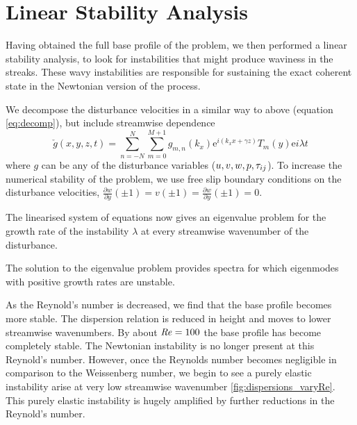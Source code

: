 \documentclass{jfm}
\newcommand{\dy}[1]{\frac{\partial #1}{\partial y}}
\newcommand{\me}{\mathrm{e}}
\newcommand\Rey{\mbox{\textit{Re}}}  %
\begin{document}
\section{Linear Stability Analysis}\label{sec:linear_stability}

Having obtained the full base profile of the problem, we then performed a linear stability analysis, to look for instabilities that might produce waviness in the streaks. These wavy instabilities are responsible for sustaining the exact coherent state in the Newtonian version of the process.

We decompose the disturbance velocities in a similar way to above (equation \ref{eq:decomp}), but include streamwise dependence
\begin{equation}
    \check{g}(x,y,z,t) = \sum_{n=-N}^{N} \sum_{m=0}^{M+1} g_{m,n}(k_{x}) \me^{i(k_{x} x + \gamma z)} T_{m}(y) \me{i\lambda t}\label{eq:decomp_disturbances}
\end{equation}
where $g$ can be any of the disturbance variables ($u,v,w,p,\boldmath{\tau}_{ij}$). To increase the numerical stability of the problem, we use free slip boundary conditions on the disturbance velocities, $\dy{w}(\pm1) = v(\pm 1) = \dy{w}(\pm1) = 0$.

The linearised system of equations now gives an eigenvalue problem for the growth rate of the instability $\lambda$ at every streamwise wavenumber of the disturbance.

The solution to the eigenvalue problem provides spectra for which eigenmodes with positive growth rates are unstable.

As the Reynold's number is decreased, we find that the base profile becomes more stable. The dispersion relation is reduced in height and moves to lower streamwise wavenumbers. By about $\Rey = 100$ the base profile has become completely stable. The Newtonian instability is no longer present at this Reynold's number. However, once the Reynolds number becomes negligible in comparison to the Weissenberg number, we begin to see a purely elastic instability arise at very low streamwise wavenumber \ref{fig:dispersions_varyRe}. This purely elastic instability is hugely amplified by further reductions in the Reynold's number.
\end{document}
